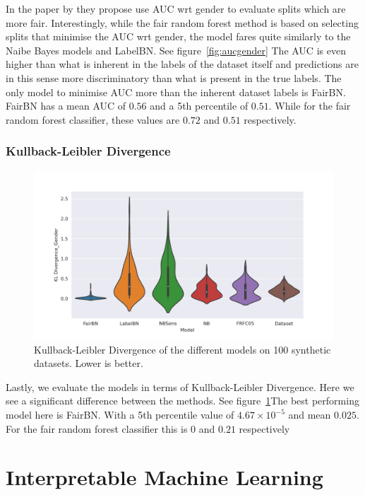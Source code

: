 In the paper by \citet{Antonio:2021:arXiv} they propose use AUC wrt gender to evaluate splits which are more fair. Interestingly, while the fair random forest method is based on selecting splits that minimise the AUC wrt gender, the model fares quite similarly to the Naibe Bayes models and LabelBN. See figure~\ref{fig:aucgender} The AUC is even higher than what is inherent in the labels of the dataset itself and predictions are in this sense more discriminatory than what is present in the true labels. The only model to minimise AUC more than the inherent dataset labels is FairBN. FairBN has a mean AUC of $0.56$ and a 5th percentile of $0.51$. While for the fair random forest classifier, these values are $0.72$ and $0.51$ respectively.

\subsubsection{Kullback-Leibler Divergence}

\begin{figure}
    \centering
    \includegraphics[width=\linewidth]{figures/kldg-synthetic.png}
    \caption{Kullback-Leibler Divergence of the different models on 100 synthetic datasets. Lower is better.}
    \label{fig:kldg-synthetic}
\end{figure}

Lastly, we evaluate the models in terms of Kullback-Leibler Divergence. Here we see a significant difference between the methods. See figure~\ref{fig:kldg-synthetic}The best performing model here is FairBN. With a 5th percentile value of $4.67 \times 10^{-5}$ and mean $0.025$. For the fair random forest classifier this is $0$ and $0.21$ respectively

\section{Interpretable Machine Learning}

